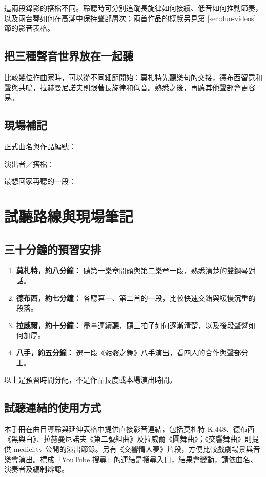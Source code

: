 \documentclass[UTF8,12pt,a4paper,fontset=none]{ctexart}
\begin{document}
這兩段錄影的搭檔不同。聆聽時可分別追蹤長旋律如何接續、低音如何推動節奏，以及兩台琴如何在高潮中保持聲部層次；兩首作品的概覽另見第 \ref{sec:duo-videos} 節的影音表格。

\subsection{把三種聲音世界放在一起聽}
比較幾位作曲家時，可以從不同細節開始：莫札特先聽樂句的交接，德布西留意和聲與共鳴，拉赫曼尼諾夫則跟著長旋律和低音。熟悉之後，再聽其他聲部會更容易。

\subsection{現場補記}
正式曲名與作品編號：\hrulefill\par\vspace{0.4cm}
演出者／搭檔：\hrulefill\par\vspace{0.4cm}
最想回家再聽的一段：\hrulefill
\clearpage
\section{試聽路線與現場筆記}
\subsection{三十分鐘的預習安排}
\begin{enumerate}[leftmargin=*,itemsep=5pt]
\item \textbf{莫札特，約八分鐘：} 聽第一樂章開頭與第二樂章一段，熟悉清楚的雙鋼琴對話。
\item \textbf{德布西，約七分鐘：} 各聽第一、第二首的一段，比較快速交錯與緩慢沉重的段落。
\item \textbf{拉威爾，約十分鐘：} 盡量連續聽，聽三拍子如何逐漸清楚，以及後段聲響如何加厚。
\item \textbf{八手，約五分鐘：} 選一段《骷髏之舞》八手演出，看四人的合作與聲部分工。
\end{enumerate}
以上是預習時間分配，不是作品長度或本場演出時間。

\subsection{試聽連結的使用方式}
本手冊在曲目導聆與延伸表格中提供直接影音連結，包括莫札特 K.448、德布西《黑與白》、拉赫曼尼諾夫《第二號組曲》及拉威爾《圓舞曲》；《交響舞曲》則提供 medici.tv 公開的演出節錄。另有《交響情人夢》片段，方便比較戲劇場景與音樂會演出。標成「YouTube 搜尋」的連結是搜尋入口，結果會變動，請依曲名、演奏者及編制辨認。
\end{document}
